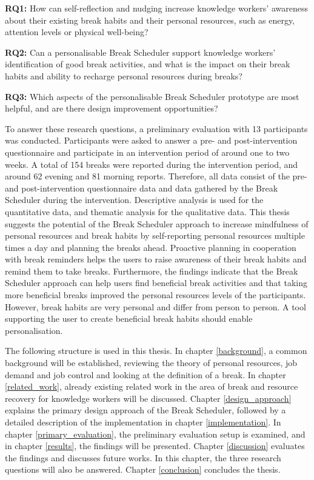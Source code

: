 \documentclass{hasel_thesis}
\begin{document}
\textbf{RQ1:} How can self-reflection and nudging increase knowledge workers' awareness about their existing break habits and their personal resources, such as energy, attention levels or physical well-being?

\textbf{RQ2:} Can a personalisable Break Scheduler support knowledge workers' identification of good break activities, and what is the impact on their break habits and ability to recharge personal resources during breaks?

\textbf{RQ3:} Which aspects of the personalisable Break Scheduler prototype are most helpful, and are there design improvement opportunities?

To answer these research questions, a preliminary evaluation with 13 participants was conducted. Participants were asked to answer a pre- and post-intervention questionnaire and participate in an intervention period of around one to two weeks.
A total of 154 breaks were reported during the intervention period, and around 62 evening and 81 morning reports. Therefore, all data consist of the pre- and post-intervention questionnaire data and data gathered by the Break Scheduler during the intervention. Descriptive analysis is used for the quantitative data, and thematic analysis for the qualitative data.
This thesis suggests the potential of the Break Scheduler approach to increase mindfulness of personal resources and break habits by self-reporting personal resources multiple times a day and planning the breaks ahead. Proactive planning in cooperation with break reminders helps the users to raise awareness of their break habits and remind them to take breaks. Furthermore, the findings indicate that the Break Scheduler approach can help users find beneficial break activities and that taking more beneficial breaks improved the personal resources levels of the participants. However, break habits are very personal and differ from person to person. A tool supporting the user to create beneficial break habits should enable personalisation.

The following structure is used in this thesis. In chapter \ref{background}, a common background will be established, reviewing the theory of personal resources, job demand and job control and looking at the definition of a break. In chapter \ref{related_work}, already existing related work in the area of break and resource recovery for knowledge workers will be discussed. Chapter \ref{design_approach} explains the primary design approach of the Break Scheduler, followed by a detailed description of the implementation in chapter \ref{implementation}. In chapter \ref{primary_evaluation}, the preliminary evaluation setup is examined, and in chapter \ref{results}, the findings will be presented. Chapter \ref{discussion} evaluates the findings and discusses future works. In this chapter, the three research questions will also be answered. Chapter \ref{conclusion} concludes the thesis.
\end{document}
